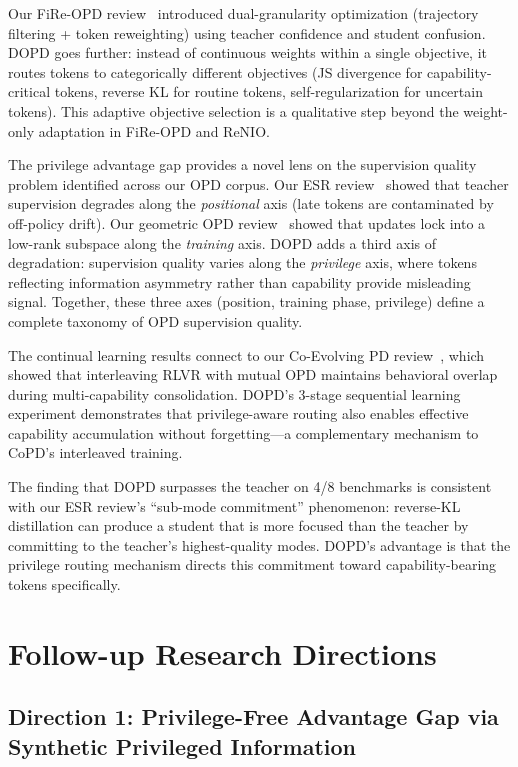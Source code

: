 \documentclass[11pt,a4paper]{article}
\begin{document}
Our FiRe-OPD review~\cite{li2026fireopd} introduced dual-granularity optimization (trajectory filtering + token reweighting) using teacher confidence and student confusion. DOPD goes further: instead of continuous weights within a single objective, it routes tokens to categorically different objectives (JS divergence for capability-critical tokens, reverse KL for routine tokens, self-regularization for uncertain tokens). This adaptive objective selection is a qualitative step beyond the weight-only adaptation in FiRe-OPD and ReNIO.

The privilege advantage gap provides a novel lens on the supervision quality problem identified across our OPD corpus. Our ESR review~\cite{wang2026esr} showed that teacher supervision degrades along the \emph{positional} axis (late tokens are contaminated by off-policy drift). Our geometric OPD review~\cite{shen2026geometry} showed that updates lock into a low-rank subspace along the \emph{training} axis. DOPD adds a third axis of degradation: supervision quality varies along the \emph{privilege} axis, where tokens reflecting information asymmetry rather than capability provide misleading signal. Together, these three axes (position, training phase, privilege) define a complete taxonomy of OPD supervision quality.

The continual learning results connect to our Co-Evolving PD review~\cite{copd2026}, which showed that interleaving RLVR with mutual OPD maintains behavioral overlap during multi-capability consolidation. DOPD's 3-stage sequential learning experiment demonstrates that privilege-aware routing also enables effective capability accumulation without forgetting---a complementary mechanism to CoPD's interleaved training.

The finding that DOPD surpasses the teacher on 4/8 benchmarks is consistent with our ESR review's ``sub-mode commitment'' phenomenon: reverse-KL distillation can produce a student that is more focused than the teacher by committing to the teacher's highest-quality modes. DOPD's advantage is that the privilege routing mechanism directs this commitment toward capability-bearing tokens specifically.

\section{Follow-up Research Directions}

\subsection{Direction 1: Privilege-Free Advantage Gap via Synthetic Privileged Information}
\end{document}
